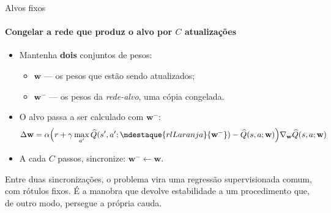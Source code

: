 \documentclass[aspectratio=169, 11pt]{beamer}
\newcommand{\Qhat}{\widehat{Q}}
\newcommand{\wv}{\mathbf{w}}
\newcommand{\wtar}{\mathbf{w}^{-}}
\begin{document}
\begin{frame}{Alvos fixos}
  \framesubtitle{Congelar a rede que produz o alvo por $C$ atualizações}

  \begin{itemize}\setlength{\itemsep}{0.35ex}
    \item Mantenha \textbf{dois} conjuntos de pesos:
      \begin{itemize}\setlength{\itemsep}{0.15ex}
        \item $\wv$ --- os pesos que estão sendo atualizados;
        \item $\wtar$ --- os pesos da \emph{rede-alvo}, uma cópia congelada.
      \end{itemize}
    \item O alvo passa a ser calculado com $\wtar$:
      \[ \Delta\wv = \alpha\Bigl(r + \gamma \max_{a'} \Qhat(s',a';\mdestaque{rlLaranja}{\wtar}) - \Qhat(s,a;\wv)\Bigr)\nabla_{\wv}\Qhat(s,a;\wv) \]
    \item A cada $C$ passos, sincronize: $\wtar \leftarrow \wv$.
  \end{itemize}

  \begin{ideiabox}
    Entre duas sincronizações, o problema vira uma regressão supervisionada
    comum, com rótulos fixos. É a manobra que devolve estabilidade a um
    procedimento que, de outro modo, persegue a própria cauda.
  \end{ideiabox}
\end{frame}
\end{document}
